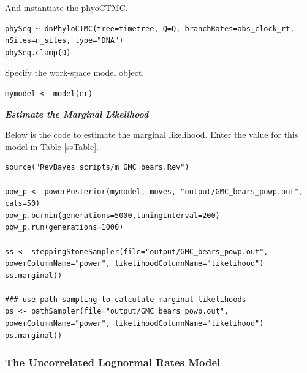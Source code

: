 And instantiate the phyoCTMC.
{\tt \begin{snugshade*}
\begin{lstlisting}
phySeq ~ dnPhyloCTMC(tree=timetree, Q=Q, branchRates=abs_clock_rt, nSites=n_sites, type="DNA")
phySeq.clamp(D)
\end{lstlisting}
\end{snugshade*}}

Specify the work-space model object.
{\tt \begin{snugshade*}
\begin{lstlisting}
mymodel <- model(er)
\end{lstlisting}
\end{snugshade*}}


\textbf{\textit{Estimate the Marginal Likelihood}}

Below is the code to estimate the marginal likelihood. 
Enter the value for this model in Table \ref{ssTable}.


{\tt \begin{snugshade*}
\begin{lstlisting}
source("RevBayes_scripts/m_GMC_bears.Rev")

pow_p <- powerPosterior(mymodel, moves, "output/GMC_bears_powp.out", cats=50) 
pow_p.burnin(generations=5000,tuningInterval=200)
pow_p.run(generations=1000)  

ss <- steppingStoneSampler(file="output/GMC_bears_powp.out", powerColumnName="power", likelihoodColumnName="likelihood")
ss.marginal() 

### use path sampling to calculate marginal likelihoods
ps <- pathSampler(file="output/GMC_bears_powp.out", powerColumnName="power", likelihoodColumnName="likelihood")
ps.marginal() 
\end{lstlisting}
\end{snugshade*}}


\bigskip
\subsubsection{The Uncorrelated Lognormal Rates Model}

